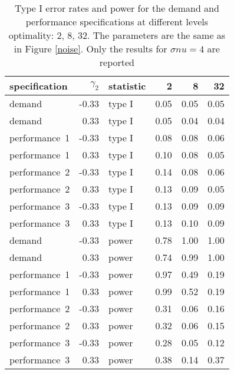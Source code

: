 \begin{table}[ht]
\centering
\begingroup\footnotesize
\begin{tabular}{lrlrrr}
  \hline
specification & $\gamma_2$ & statistic & 2 & 8 & 32 \\ 
  \hline
demand & -0.33 & type I & 0.05 & 0.05 & 0.05 \\ 
  demand & 0.33 & type I & 0.05 & 0.04 & 0.04 \\ 
  performance~1 & -0.33 & type I & 0.08 & 0.08 & 0.06 \\ 
  performance~1 & 0.33 & type I & 0.10 & 0.08 & 0.05 \\ 
  performance~2 & -0.33 & type I & 0.14 & 0.08 & 0.06 \\ 
  performance~2 & 0.33 & type I & 0.13 & 0.09 & 0.05 \\ 
  performance~3 & -0.33 & type I & 0.13 & 0.09 & 0.09 \\ 
  performance~3 & 0.33 & type I & 0.13 & 0.10 & 0.09 \\ 
  demand & -0.33 & power & 0.78 & 1.00 & 1.00 \\ 
  demand & 0.33 & power & 0.74 & 0.99 & 1.00 \\ 
  performance~1 & -0.33 & power & 0.97 & 0.49 & 0.19 \\ 
  performance~1 & 0.33 & power & 0.99 & 0.52 & 0.19 \\ 
  performance~2 & -0.33 & power & 0.31 & 0.06 & 0.16 \\ 
  performance~2 & 0.33 & power & 0.32 & 0.06 & 0.15 \\ 
  performance~3 & -0.33 & power & 0.28 & 0.05 & 0.12 \\ 
  performance~3 & 0.33 & power & 0.38 & 0.14 & 0.37 \\ 
   \hline
\end{tabular}
\endgroup
\caption{Type I error rates and power for the demand and
             performance specifications at different levels optimality: 
             2, 8, 32. The parameters are the same as in Figure \ref{noise}.
             Only the results for $\sigma{nu} = 4$ are reported} 
\label{noise-table}
\end{table}
